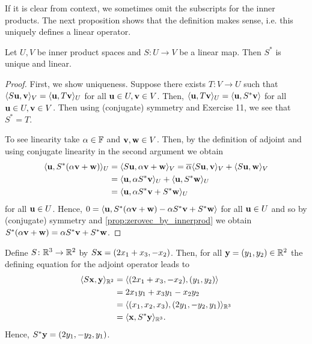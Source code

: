 \documentclass{article}
\begin{document}
If it is clear from context, we sometimes omit the subscripts for the inner products. The next proposition shows that the definition makes sense, i.e. this uniquely defines a linear operator.

\begin{proposition}
Let $U,V$ be inner product spaces and $S\colon U \to V$ be a linear map. Then $S^*$ is unique and linear. 
\end{proposition}

\begin{proof}
First, we show uniqueness. Suppose there exists $T\colon V \to U$ such that $\langle S{\mathbf{u}},{\mathbf{v}} \rangle_V = \langle {\mathbf{u}},T{\mathbf{v}} \rangle_U$ for all ${\mathbf{u}}\in U, {\mathbf{v}}\in V$. Then, $\langle {\mathbf{u}},T{\mathbf{v}} \rangle_U = \langle {\mathbf{u}}, S^*{\mathbf{v}} \rangle$ for all ${\mathbf{u}}\in U, {\mathbf{v}}\in V$. Then using (conjugate) symmetry and Exercise 11, we see that $S^*= T$.

To see linearity take $\alpha\in {\mathbb{F}}$ and ${\mathbf{v}},{\mathbf{w}} \in V$. Then, by the definition of adjoint and using  conjugate linearity in the second argument we obtain 
\begin{align*}
    \langle {\mathbf{u}}, S^*(\alpha{\mathbf{v}}+{\mathbf{w}}) \rangle_U &= \langle S{\mathbf{u}},\alpha{\mathbf{v}}+{\mathbf{w}} \rangle_V =\overline{\alpha}\langle S{\mathbf{u}},{\mathbf{v}} \rangle_V + \langle S{\mathbf{u}},{\mathbf{w}} \rangle_V\\
   &=\langle {\mathbf{u}},\alpha S^*{\mathbf{v}} \rangle_U + \langle {\mathbf{u}},S^*{\mathbf{w}} \rangle_U\\ &= \langle {\mathbf{u}},\alpha S^*{\mathbf{v}}+ S^*{\mathbf{w}} \rangle_U
\end{align*}
for all ${\mathbf{u}} \in U$. Hence, $0 = \langle {\mathbf{u}}, S^*(\alpha{\mathbf{v}}+{\mathbf{w}})- \alpha S^*{\mathbf{v}}+ S^*{\mathbf{w}} \rangle$ for all ${\mathbf{u}}\in U$ and so by (conjugate) symmetry and \cref{prop:zerovec_by_innerprod} we obtain $S^*(\alpha{\mathbf{v}}+{\mathbf{w}}) = \alpha S^*{\mathbf{v}}+ S^*{\mathbf{w}}$. 
\end{proof}

\begin{example}
Define $S \colon {\mathbb{R}}^3 \to {\mathbb{R}}^2$ by $S{\mathbf{x}} = (2x_1+x_3,-x_2)$. Then, for all ${\mathbf{y}}= (y_1,y_2) \in {\mathbb{R}}^2$ the defining equation for the adjoint operator leads to
\begin{align*}
    \langle S{\mathbf{x}}, {\mathbf{y}} \rangle_{{\mathbb{R}}^2} &= \langle (2x_1+x_3,-x_2), (y_1,y_2) \rangle \\
    &= 2x_1y_1 +x_3y_1-x_2y_2\\
    &= \langle (x_1,x_2,x_3),(2y_1,-y_2,y_1) \rangle_{{\mathbb{R}}^3}\\
    &= \langle {\mathbf{x}},S^*{\mathbf{y}} \rangle_{{\mathbb{R}}^3}.
\end{align*}
Hence, $S^*{\mathbf{y}} = (2y_1,-y_2,y_1)$.
\end{example}
\end{document}
